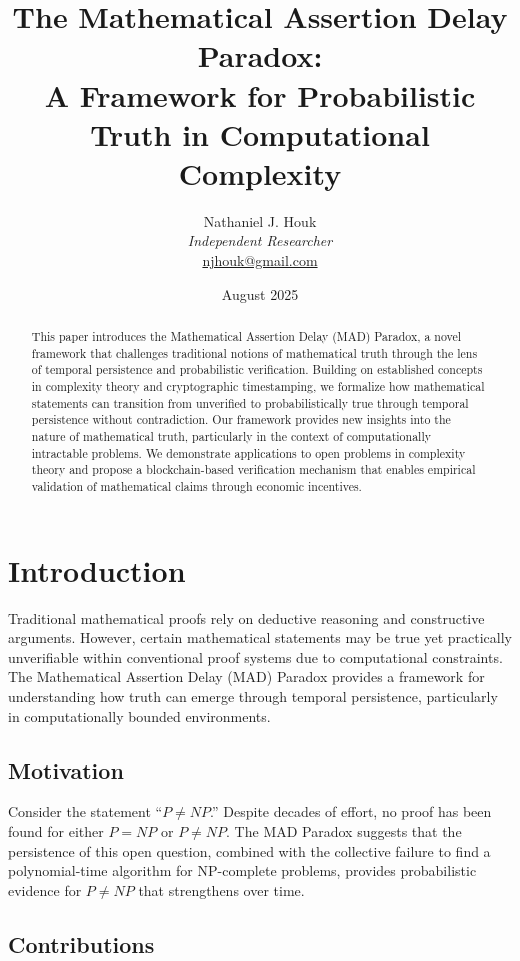\documentclass[11pt]{article}
\title{The Mathematical Assertion Delay Paradox: \\ A Framework for Probabilistic Truth in Computational Complexity}
\author{Nathaniel J. Houk\\
\textit{Independent Researcher}\\
\href{mailto:njhouk@gmail.com}{njhouk@gmail.com}}
\date{August 2025}
\begin{document}
\maketitle

\begin{abstract}
This paper introduces the Mathematical Assertion Delay (MAD) Paradox, a novel framework that challenges traditional notions of mathematical truth through the lens of temporal persistence and probabilistic verification. Building on established concepts in complexity theory and cryptographic timestamping, we formalize how mathematical statements can transition from unverified to probabilistically true through temporal persistence without contradiction. Our framework provides new insights into the nature of mathematical truth, particularly in the context of computationally intractable problems. We demonstrate applications to open problems in complexity theory and propose a blockchain-based verification mechanism that enables empirical validation of mathematical claims through economic incentives.
\end{abstract}

\section{Introduction}

Traditional mathematical proofs rely on deductive reasoning and constructive arguments. However, certain mathematical statements may be true yet practically unverifiable within conventional proof systems due to computational constraints. The Mathematical Assertion Delay (MAD) Paradox provides a framework for understanding how truth can emerge through temporal persistence, particularly in computationally bounded environments.

\subsection{Motivation}

Consider the statement ``$P \neq NP$.'' Despite decades of effort, no proof has been found for either $P = NP$ or $P \neq NP$. The MAD Paradox suggests that the persistence of this open question, combined with the collective failure to find a polynomial-time algorithm for NP-complete problems, provides probabilistic evidence for $P \neq NP$ that strengthens over time.

\subsection{Contributions}
\end{document}
